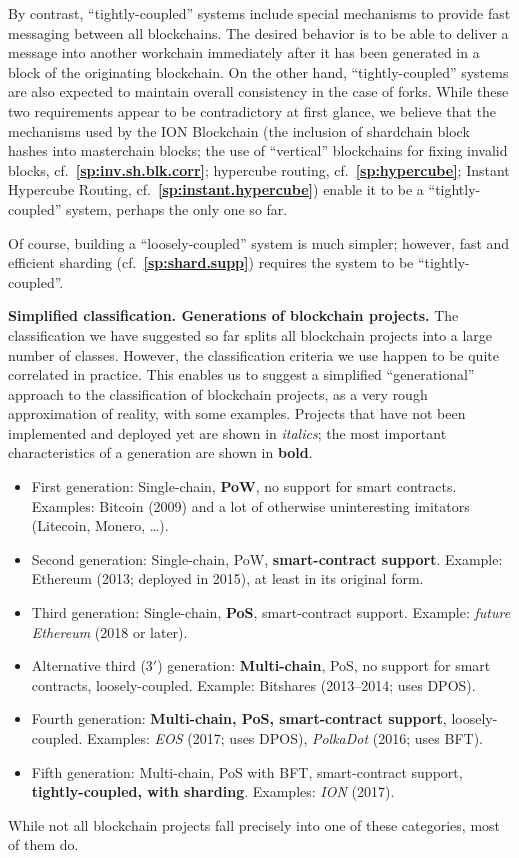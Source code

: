 \documentclass[12pt,oneside]{article}
\def\makepoint#1{\medbreak\noindent{\bf #1.\ }}
\def\nxsubpoint{\refstepcounter{subsubsection}%
  \smallbreak\makepoint{\thesubsubsection}}
\def\refpoint#1{{\rm\textbf{\ref{#1}}}}
\let\ptref=\refpoint
\def\embt(#1.){\textbf{#1.}}
\begin{document}
By contrast, ``tightly-coupled'' systems include special mechanisms to
provide fast messaging between all blockchains. The desired behavior
is to be able to deliver a message into another workchain immediately
after it has been generated in a block of the originating
blockchain. On the other hand, ``tightly-coupled'' systems are also
expected to maintain overall consistency in the case of forks. While
these two requirements appear to be contradictory at first glance, we
believe that the mechanisms used by the ION Blockchain (the inclusion
of shardchain block hashes into masterchain blocks; the use of
``vertical'' blockchains for fixing invalid blocks,
cf.~\ptref{sp:inv.sh.blk.corr}; hypercube routing,
cf.~\ptref{sp:hypercube}; Instant Hypercube Routing,
cf.~\ptref{sp:instant.hypercube}) enable it to be a
``tightly-coupled'' system, perhaps the only one so far.

Of course, building a ``loosely-coupled'' system is much simpler;
however, fast and efficient sharding (cf.~\ptref{sp:shard.supp})
requires the system to be ``tightly-coupled''.

\nxsubpoint\label{sp:blkch.gen} \embt(Simplified
classification. Generations of blockchain projects.)  The
classification we have suggested so far splits all blockchain projects
into a large number of classes. However, the classification criteria
we use happen to be quite correlated in practice. This enables us to
suggest a simplified ``generational'' approach to the classification
of blockchain projects, as a very rough approximation of reality,
with some examples. Projects that have not been implemented and
deployed yet are shown in {\em italics}; the most important
characteristics of a generation are shown in {\bf bold}.
\begin{itemize}
\item First generation: Single-chain, {\bf PoW}, no support for smart
  contracts. Examples: Bitcoin (2009) and a lot of otherwise
  uninteresting imitators (Litecoin, Monero, \dots).
\item Second generation: Single-chain, PoW, {\bf smart-contract
  support}. Example: Ethereum (2013; deployed in 2015), at least in
  its original form.
\item Third generation: Single-chain, {\bf PoS}, smart-contract
  support. Example: {\em future Ethereum} (2018 or later).
\item Alternative third ($3'$) generation: {\bf Multi-chain}, PoS, no
  support for smart contracts, loosely-coupled. Example: Bitshares
  (2013--2014; uses DPOS).
\item Fourth generation: {\bf Multi-chain, PoS, smart-contract
  support}, loosely-coupled. Examples: {\em EOS\/} (2017; uses DPOS),
  {\em PolkaDot\/} (2016; uses BFT).
\item Fifth generation: Multi-chain, PoS with BFT, smart-contract
  support, {\bf tightly-coupled, with sharding}. Examples: {\em ION\/}
  (2017).
\end{itemize}
While not all blockchain projects fall precisely into one of these
categories, most of them do.
\end{document}
